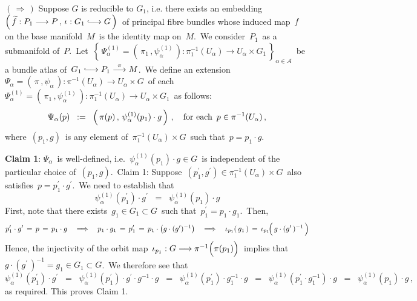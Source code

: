 \vskip 0.3cm
\noindent
\underline{$(\,\Longrightarrow\,)$}\;\;
Suppose $G$ is reducible to $G_{1}$, i.e. there exists an embedding
\,$\left(\,\widetilde{f} : P_{1} \longrightarrow P \,,\, \iota : G_{1} \longhookrightarrow G\,\right)$\,
of principal fibre bundles
whose induced map \,$f$\, on the base manifold \,$M$\, is the identity map on \,$M$.\,
We consider \,$P_{1}$\, as a submanifold of \,$P$.\,
Let
\,$\left\{\,\Psi^{(1)}_{\alpha} = (\,\pi_{1}\,,\psi^{(1)}_{\alpha}\,) : \pi_{1}^{-1}(U_{\alpha}) \longrightarrow U_{\alpha} \times G_{1}\,\right\}_{\alpha\in\mathcal{A}}$\,
be a bundle atlas of
\,$G_{1} \longhookrightarrow P_{1} \overset{\pi}{\longrightarrow} M$.\,
We define an extension
\,$\Psi_{\alpha} = (\,\pi\,,\psi_{\alpha}\,) : \pi^{-1}(U_{\alpha}) \longrightarrow U_{\alpha} \times G$\,
of each
\,$\Psi^{(1)}_{\alpha} = (\,\pi_{1}\,,\psi^{(1)}_{\alpha}\,) : \pi_{1}^{-1}(U_{\alpha}) \longrightarrow U_{\alpha} \times G_{1}$\,
as follows:
\begin{equation*}
\Psi_{\alpha}(p)
\;\; := \;\;
	\left(\,\pi(p)\,,\,\psi^{(1)}_{\alpha}(p_{1}) \cdot g\,\right)\,,
\quad
\textnormal{for each \,$p \in \pi^{-1}(U_{\alpha})$}\,,
\end{equation*}
where \,$(p_{1},g)$\, is any element of \,$\pi_{1}^{-1}(U_{\alpha}) \times G$\, such that \,$p = p_{1} \cdot g$.\,

\vskip 0.5cm
\noindent
\textbf{Claim 1}:\quad
$\Psi_{\alpha}$\, is well-defined, i.e. \,$\psi^{(1)}_{\alpha}(p_{1}) \cdot g \in G$\, is independent of the particular choice of \,$(p_{1},g)$.\,
\vskip 0.2cm
\proofof Claim 1:\quad
Suppose
\,$(p_{1}^{\prime},g^{\prime}) \in \pi_{1}^{-1}(U_{\alpha}) \times G$\,
also satisfies
\,$p = p_{1}^{\prime} \cdot g^{\prime}$.\,
We need to establish that
\begin{equation*}
\psi^{(1)}_{\alpha}(p_{1}^{\prime}) \cdot g^{\prime}
\;\; = \;\;
	\psi^{(1)}_{\alpha}(p_{1}) \cdot g
\end{equation*}
First, note that there exists \,$g_{1} \in G_{1} \subset G$\, such that \,$p_{1}^{\prime} = p_{1} \cdot g_{1}$.\,
Then,
\begin{equation*}
p_{1}^{\prime} \cdot g^{\prime} \,=\, p \,=\, p_{1} \cdot g
\quad\Longrightarrow\quad
p_{1} \cdot g_{1} \,=\, p_{1}^{\prime} \,=\, p_{1} \cdot \left(g \cdot (g^{\prime})^{-1}\right)
\quad\Longrightarrow\quad
\iota_{p_{1}}(\,g_{1}\,) \,=\, \iota_{p_{1}}\!\!\left(\,\overset{{\color{white}1}}{g} \cdot (g^{\prime}\,)^{-1}\,\right)
\end{equation*}
Hence, the injectivity of the orbit map
\,$\iota_{p_{1}} : G \longrightarrow \pi^{-1}\!\left(\overset{{\color{white}-}}{\pi}(p_{1})\right)$\,
implies that
\,$g \cdot (g^{\prime}\,)^{-1} = g_{1} \in G_{1} \subset G$.\,
We therefore see that
\begin{equation*}
\psi^{(1)}_{\alpha}(p_{1}^{\prime}) \cdot g^{\prime}
\;\; = \;\;
	\psi^{(1)}_{\alpha}(p_{1}^{\prime}) \cdot g^{\prime} \cdot g^{-1} \cdot g
\;\; = \;\;
	\psi^{(1)}_{\alpha}(p_{1}^{\prime}) \cdot g_{1}^{-1} \cdot g
\;\; = \;\;
	\psi^{(1)}_{\alpha}(p_{1}^{\prime} \cdot g_{1}^{-1}) \cdot g
\;\; = \;\;
	\psi^{(1)}_{\alpha}(p_{1}) \cdot g\,,
\end{equation*}
as required. This proves Claim 1.

